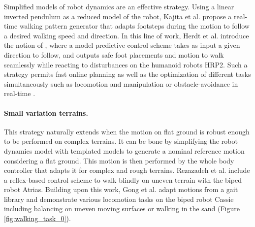 Simplified models of robot dynamics are an effective strategy.
Using a linear inverted pendulum as a reduced model of the robot, Kajita et al. \cite{kajita2002LIP2} propose a real-time walking pattern generator that adapts footsteps during the motion to follow a desired walking speed and direction.
In this line of work, Herdt et al. \cite{herd_2010, herd_perrin_2010} introduce the notion of , where a model predictive control scheme takes as input a given direction to follow, and outputs safe foot placements and motion to walk seamlessly while reacting to disturbances on the humanoid robots HRP2.
Such a strategy permits fast online planning \cite{hurst_2018} as well as the optimization of different tasks simultaneously such as locomotion and manipulation \cite{florent2012} or obstacle-avoidance in real-time \cite{naveau2017}.


\paragraph{Small variation terrains.\label{par:whole-body:uneven}}
This strategy naturally extends when the motion on flat ground is robust enough to be performed on complex terrains.
It can be bone by simplifying the robot dynamics model with templated models to generate a nominal reference motion considering a flat ground.
This motion is then performed by the whole body controller that adapts it for complex and rough terrains.
Rezazadeh et al. \cite{rezazadeh_hurst_atrias_2020} include a reflex-based control scheme to walk blindly on uneven terrain with the biped robot Atrias.
Building upon this work, Gong et al. \cite{Cassie_feedback_control_2018} adapt motions from a gait library and demonstrate various locomotion tasks on the biped robot Cassie including   balancing on uneven moving surfaces or walking in the sand (Figure \ref{fig:walking_task_0}).

